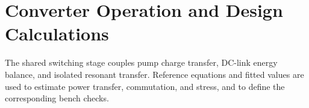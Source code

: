 \chapter{Converter Operation and Design Calculations}
\label{ch:analysis}

The shared switching stage couples pump charge transfer, DC-link energy balance, and isolated resonant transfer. Reference equations and fitted values are used to estimate power transfer, commutation, and stress, and to define the corresponding bench checks.












